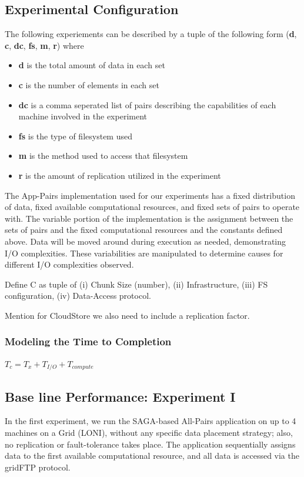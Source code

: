 \documentclass{rspublic}
\begin{document}
\subsection{Experimental Configuration}

The following experiements can be described by a tuple of the following form
(\textbf{d}, \textbf{c}, \textbf{dc}, \textbf{fs}, \textbf{m}, \textbf{r})
where

\begin{itemize} 
\item \textbf{d} is the total amount of data in each set
\item \textbf{c} is the number of elements in each set
\item \textbf{dc} is a comma seperated list of pairs describing the
capabilities of each machine involved in the experiment
\item \textbf{fs} is the type of filesystem used
\item \textbf{m} is the method used to access that filesystem
\item \textbf{r} is the amount of replication utilized in the experiment
\end{itemize}

The App-Pairs implementation used for our experiments has a fixed distribution
of data, fixed available computational resources, and fixed sets of pairs to
operate with.  The variable portion of the implementation is the assignment
between the sets of pairs and the fixed computational resources and the
constants defined above.  Data will be moved around during execution as needed,
demonstrating I/O complexities.  These variabilities are manipulated to
determine causes for different I/O complexities observed.

Define C as  tuple of (i) Chunk Size (number), (ii) Infrastructure,
(iii) FS configuration, (iv) Data-Access protocol.

Mention for CloudStore we also need to include a replication factor.

\subsubsection{Modeling the Time to Completion}

$T_c = T_x + T_{I/O} + T_{compute}$

\subsection{Base line Performance: Experiment I} In the first experiment, we
run the SAGA-based All-Pairs application on up to 4 machines on a Grid (LONI),
without any specific data placement strategy; also, no replication or
fault-tolerance takes place.  The application sequentially assigns data to the
first available computational resource, and all data is accessed via the
gridFTP protocol.
\end{document}
